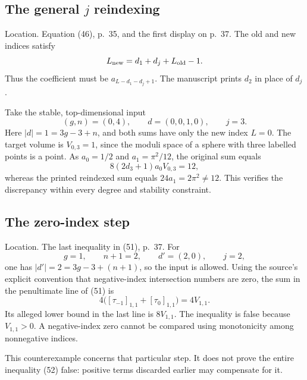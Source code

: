 \documentclass[10pt]{article}
\begin{document}
\subsection*{The general \(j\) reindexing}
Location. Equation (46), p. 35, and the first display on p. 37. The old and new indices satisfy \[L_{\rm new}=d_1+d_j+L_{\rm old}-1.\] Thus the coefficient must be \(a_{L-d_1-d_j+1}\). The manuscript prints \(d_2\) in place of \(d_j\).\par
Take the stable, top-dimensional input \[(g,n)=(0,4),\qquad d=(0,0,1,0),\qquad j=3.\] Here \(|d|=1=3g-3+n\), and both sums have only the new index \(L=0\). The target volume is \(V_{0,3}=1\), since the moduli space of a sphere with three labelled points is a point. As \(a_0=1/2\) and \(a_1=\pi^2/12\), the original sum equals \[8(2d_3+1)a_0V_{0,3}=12,\] whereas the printed reindexed sum equals \(24a_1=2\pi^2\ne12\). This verifies the discrepancy within every degree and stability constraint.\par
\subsection*{The zero-index step}
Location. The last inequality in (51), p. 37. For \[g=1,\qquad n+1=2,\qquad d'=(2,0),\qquad j=2,\] one has \(|d'|=2=3g-3+(n+1)\), so the input is allowed. Using the source’s explicit convention that negative-index intersection numbers are zero, the sum in the penultimate line of (51) is \[4\bigl([\tau_{-1}]_{1,1}+[\tau_0]_{1,1}\bigr)=4V_{1,1}.\] Its alleged lower bound in the last line is \(8V_{1,1}\). The inequality is false because \(V_{1,1}>0\). A negative-index zero cannot be compared using monotonicity among nonnegative indices.\par
This counterexample concerns that particular step. It does not prove the entire inequality (52) false: positive terms discarded earlier may compensate for it.\par
\end{document}
